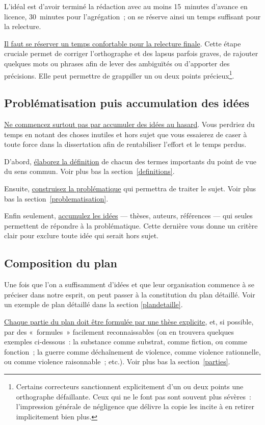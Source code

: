 \documentclass[a4paper,12pt]{article}
\begin{document}
L'idéal est d'avoir terminé la rédaction avec au moins 15 minutes
d'avance en licence, 30 minutes pour l'agrégation ; on se réserve ainsi
un temps suffisant pour la relecture. 

\uline{Il faut se réserver un temps confortable pour la relecture finale}.
Cette étape cruciale permet de corriger l'orthographe et des lapsus
parfois graves, de rajouter quelques mots ou phrases afin de lever des
ambiguïtés ou d'apporter des précisions. Elle peut permettre de
grappiller un ou deux points précieux\footnote{Certains correcteurs sanctionnent explicitement d'un ou deux points
une orthographe défaillante. Ceux qui ne le font pas sont souvent
plus sévères : l'impression générale de négligence que délivre la
copie les incite à en retirer implicitement bien plus.}.

\subsection{Problématisation puis accumulation des idées}
\label{sec-1-2}

\uline{Ne commencez surtout pas par accumuler des idées au hasard}. Vous
perdriez du temps en notant des choses inutiles et hors sujet que vous
essaierez de caser à toute force dans la dissertation afin de
rentabiliser l'effort et le temps perdus.

D'abord, \uline{élaborez la définition} de chacun des termes importants du
point de vue du sens commun. Voir plus bas la section \ref{definitions}.

Ensuite, \uline{construisez la problématique} qui permettra de traiter le
sujet. Voir plus bas la section \ref{problematisation}.

Enfin seulement, \uline{accumulez les idées} --- thèses, auteurs, références
--- qui seules permettent de répondre à la problématique. Cette dernière
vous donne un critère clair pour exclure toute idée qui serait hors
sujet.


\subsection{Composition du plan}
\label{sec-1-3}

Une fois que l'on a suffisamment d'idées et que leur organisation
commence à se préciser dans notre esprit, on peut passer à la
constitution du plan détaillé. Voir un exemple de plan détaillé dans la
section \ref{plandetaille}.

\uline{Chaque partie du plan doit être formulée par une thèse explicite}, et,
si possible, par des « formules » facilement reconnaissables (on en
trouvera quelques exemples ci-dessous : la substance comme substrat,
comme fiction, ou comme fonction ; la guerre comme déchaînement de
violence, comme violence rationnelle, ou comme violence raisonnable ;
etc.). Voir plus bas la section \ref{parties}.
\end{document}
